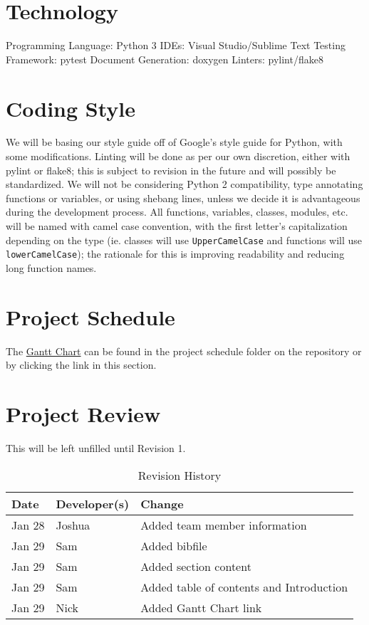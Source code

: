\documentclass{article}
\begin{document}
\section{Technology}
Programming Language: Python 3
IDEs: Visual Studio/Sublime Text
Testing Framework: pytest
Document Generation: doxygen
Linters: pylint/flake8

\section{Coding Style}
We will be basing our style guide off of Google’s style guide for Python, with 
some modifications. Linting will be done as per our own discretion, either with 
pylint or flake8; this is subject to revision in the future and will possibly be 
standardized. We will not be considering Python 2 compatibility, type annotating 
functions or variables, or using shebang lines, unless we decide it is 
advantageous during the development process. All functions, variables, classes, 
modules, etc. will be named with camel case convention, with the first letter’s 
capitalization depending on the type (ie. classes will use 
\texttt{UpperCamelCase} and functions will use \texttt{lowerCamelCase}); the 
rationale for this is improving readability and reducing long function names.

\section{Project Schedule}
The \href{run:./../../ProjectSchedule/Gantt-Chart.pdf}{Gantt Chart} can be found in the project schedule folder on the repository or by clicking the link in this section.

\section{Project Review}
This will be left unfilled until Revision 1.

\printbibliography{}

\begin{table}[h]
\caption{Revision History} \label{TblRevisionHistory}
\begin{tabularx}{\textwidth}{llX}
\toprule
\textbf{Date} & \textbf{Developer(s)} & \textbf{Change}\\
\midrule
Jan 28 & Joshua & Added team member information\\
Jan 29 & Sam & Added bibfile\\
Jan 29 & Sam & Added section content\\
Jan 29 & Sam & Added table of contents and Introduction\\
Jan 29 & Nick & Added Gantt Chart link\\
\bottomrule
\end{tabularx}
\end{table}
\end{document}
